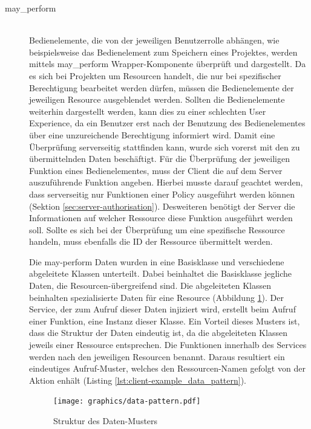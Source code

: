 \begin{description}
	\item[may\_perform]\hfill\\
	Bedienelemente, die von der jeweiligen Benutzerrolle abhängen, wie beispielsweise das Bedienelement zum Speichern eines Projektes, werden mittels may\_perform Wrapper-Komponente überprüft und dargestellt. Da es sich bei Projekten um Resourcen handelt, die nur bei spezifischer Berechtigung bearbeitet werden dürfen, müssen die Bedienelemente der jeweiligen Resource ausgeblendet werden. Sollten die Bedienelemente weiterhin dargestellt werden, kann dies zu einer schlechten User Experience, da ein Benutzer erst nach der Benutzung des Bedienelementes über eine unzureichende Berechtigung informiert wird. Damit eine Überprüfung serverseitig stattfinden kann, wurde sich vorerst mit den zu übermittelnden Daten beschäftigt. Für die Überprüfung der jeweiligen Funktion eines Bedienelementes, muss der Client die auf dem Server auszuführende Funktion angeben. Hierbei musste darauf geachtet werden, dass serverseitig nur Funktionen einer Policy ausgeführt werden können (Sektion \ref{sec:server-authorisation}). Desweiteren benötigt der Server die Informationen auf welcher Ressource diese Funktion ausgeführt werden soll. Sollte es sich bei der Überprüfung um eine spezifische Ressource handeln, muss ebenfalls die ID der Ressource übermittelt werden.
	
	
	
	Die may-perform Daten wurden in eine Basisklasse und verschiedene abgeleitete Klassen unterteilt. Dabei beinhaltet die Basisklasse jegliche Daten, die Resourcen-übergreifend sind. Die abgeleiteten Klassen beinhalten spezialisierte Daten für eine Resource (Abbildung \ref{fig:client-data-pattern}). Der Service, der zum Aufruf dieser Daten injiziert wird, erstellt beim Aufruf einer Funktion, eine Instanz dieser Klasse. Ein Vorteil dieses Musters ist, dass die Struktur der Daten eindeutig ist, da die abgeleiteten Klassen jeweils einer Ressource entsprechen. Die Funktionen innerhalb des Services werden nach den jeweiligen Resourcen benannt. Daraus resultiert ein eindeutiges Aufruf-Muster, welches den Ressourcen-Namen gefolgt von der Aktion enhält (Listing \ref{lst:client-example_data_pattern}). 
	
	\begin{figure}
		\centering
		\texttt{[image: graphics/data-pattern.pdf]}
		\caption{Struktur des Daten-Musters}
		\label{fig:client-data-pattern}
	\end{figure}


\end{description}
